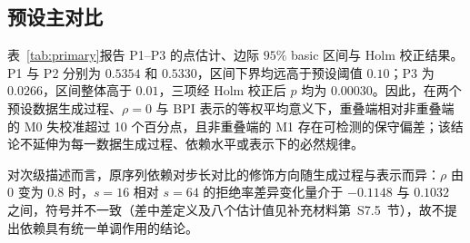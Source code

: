 

\subsection{预设主对比}\label{sec:h0-primary}
表~\ref{tab:primary}报告 P1--P3 的点估计、边际 $95\%$ basic 区间与 Holm 校正结果。P1 与 P2 分别为 $0.5354$ 和 $0.5330$，区间下界均远高于预设阈值 $0.10$；P3 为 $0.0266$，区间整体高于 $0.01$，三项经 Holm 校正后 $p$ 均为 $0.00030$。因此，在两个预设数据生成过程、$\rho=0$ 与 BPI 表示的等权平均意义下，重叠端相对非重叠端的 M0 失校准超过 10 个百分点，且非重叠端的 M1 存在可检测的保守偏差；该结论不延伸为每一数据生成过程、依赖水平或表示下的必然规律。

对次级描述而言，原序列依赖对步长对比的修饰方向随生成过程与表示而异：$\rho$ 由 $0$ 变为 $0.8$ 时，$s=16$ 相对 $s=64$ 的拒绝率差异变化量介于 $-0.1148$ 与 $0.1032$ 之间，符号并不一致（差中差定义及八个估计值见补充材料第~S7.5~节），故不提出依赖具有统一单调作用的结论。



